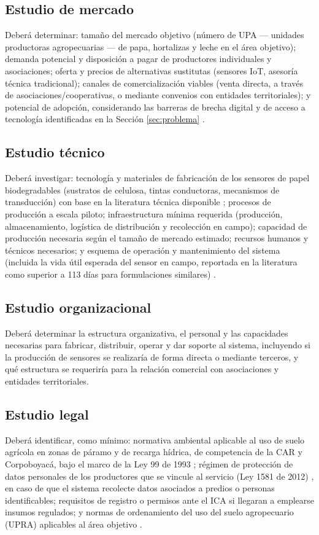 \documentclass[11pt,a4paper]{article}
\begin{document}
\subsection{Estudio de mercado}
Deberá determinar: tamaño del mercado objetivo (número de UPA --- unidades productoras agropecuarias --- de papa, hortalizas y leche en el área objetivo); demanda potencial y disposición a pagar de productores individuales y asociaciones; oferta y precios de alternativas sustitutas (sensores IoT, asesoría técnica tradicional); canales de comercialización viables (venta directa, a través de asociaciones/cooperativas, o mediante convenios con entidades territoriales); y potencial de adopción, considerando las barreras de brecha digital y de acceso a tecnología identificadas en la Sección \ref{sec:problema} \citep{mintic2023,scielo2022precision}.

\subsection{Estudio técnico}
Deberá investigar: tecnología y materiales de fabricación de los sensores de papel biodegradables (sustratos de celulosa, tintas conductoras, mecanismos de transducción) con base en la literatura técnica disponible \citep{nature2026cellulose,ieee2023biodeg,sciencedirect2025paper}; procesos de producción a escala piloto; infraestructura mínima requerida (producción, almacenamiento, logística de distribución y recolección en campo); capacidad de producción necesaria según el tamaño de mercado estimado; recursos humanos y técnicos necesarios; y esquema de operación y mantenimiento del sistema (incluida la vida útil esperada del sensor en campo, reportada en la literatura como superior a 113 días para formulaciones similares) \citep{sciencedirect2025paper}.

\subsection{Estudio organizacional}
Deberá determinar la estructura organizativa, el personal y las capacidades necesarias para fabricar, distribuir, operar y dar soporte al sistema, incluyendo si la producción de sensores se realizaría de forma directa o mediante terceros, y qué estructura se requeriría para la relación comercial con asociaciones y entidades territoriales.

\subsection{Estudio legal}
Deberá identificar, como mínimo: normativa ambiental aplicable al uso de suelo agrícola en zonas de páramo y de recarga hídrica, de competencia de la CAR y Corpoboyacá, bajo el marco de la Ley 99 de 1993 \citep{ley99_1993,car_acuerdo16_1998,corpoboyaca_car_paramo}; régimen de protección de datos personales de los productores que se vincule al servicio (Ley 1581 de 2012) \citep{ley1581_2012}, en caso de que el sistema recolecte datos asociados a predios o personas identificables; requisitos de registro o permisos ante el ICA si llegaran a emplearse insumos regulados; y normas de ordenamiento del uso del suelo agropecuario (UPRA) aplicables al área objetivo \citep{upra_papa}.
\end{document}
